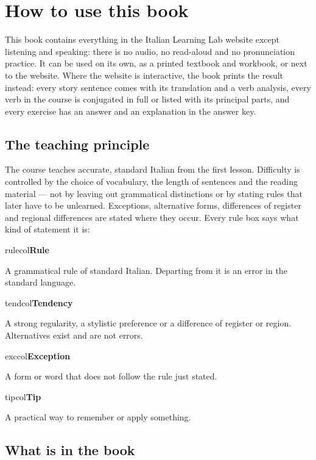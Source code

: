 \documentclass[11pt,a4paper,twoside,openright]{book}
\newcommand{\notelabel}[3]{{\sffamily\small\bfseries\color{#1}#2}\if\relax\detokenize{#3}\relax\else{\sffamily\small\bfseries\ ---\ #3}\fi\par\nopagebreak}
\begin{document}
\chapter{How to use this book}

This book contains everything in the Italian Learning Lab website except listening and speaking: there is no audio, no read-aloud and no pronunciation practice. It can be used on its own, as a printed textbook and workbook, or next to the website. Where the website is interactive, the book prints the result instead: every story sentence comes with its translation and a verb analysis, every verb in the course is conjugated in full or listed with its principal parts, and every exercise has an answer and an explanation in the answer key.

\section*{The teaching principle}

The course teaches accurate, standard Italian from the first lesson. Difficulty is controlled by the choice of vocabulary, the length of sentences and the reading material --- not by leaving out grammatical distinctions or by stating rules that later have to be unlearned. Exceptions, alternative forms, differences of register and regional differences are stated where they occur. Every rule box says what kind of statement it is:

\begin{notebox}{rulecol}\notelabel{rulecol}{Rule}{}A grammatical rule of standard Italian. Departing from it is an error in the standard language.\end{notebox}
\begin{notebox}{tendcol}\notelabel{tendcol}{Tendency}{}A strong regularity, a stylistic preference or a difference of register or region. Alternatives exist and are not errors.\end{notebox}
\begin{notebox}{exccol}\notelabel{exccol}{Exception}{}A form or word that does not follow the rule just stated.\end{notebox}
\begin{notebox}{tipcol}\notelabel{tipcol}{Tip}{}A practical way to remember or apply something.\end{notebox}

\section*{What is in the book}
\end{document}
